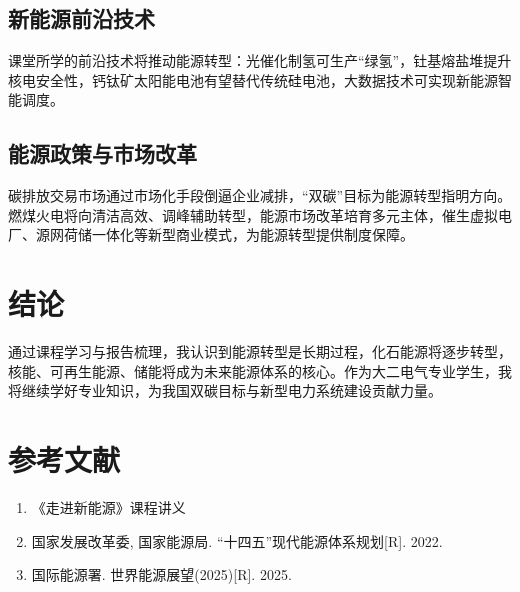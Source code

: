 \documentclass[UTF8,a4paper,12pt]{article}
\begin{document}
\subsection{新能源前沿技术}
课堂所学的前沿技术将推动能源转型：光催化制氢可生产“绿氢”，钍基熔盐堆提升核电安全性，钙钛矿太阳能电池有望替代传统硅电池，大数据技术可实现新能源智能调度。

\subsection{能源政策与市场改革}
碳排放交易市场通过市场化手段倒逼企业减排，“双碳”目标为能源转型指明方向。燃煤火电将向清洁高效、调峰辅助转型，能源市场改革培育多元主体，催生虚拟电厂、源网荷储一体化等新型商业模式，为能源转型提供制度保障。

\section{结论}
通过课程学习与报告梳理，我认识到能源转型是长期过程，化石能源将逐步转型，核能、可再生能源、储能将成为未来能源体系的核心。作为大二电气专业学生，我将继续学好专业知识，为我国双碳目标与新型电力系统建设贡献力量。

\section{参考文献}
\begin{enumerate}
    \item 《走进新能源》课程讲义
    \item 国家发展改革委, 国家能源局. “十四五”现代能源体系规划[R]. 2022.
    \item 国际能源署. 世界能源展望(2025)[R]. 2025.
\end{enumerate}
\end{document}
